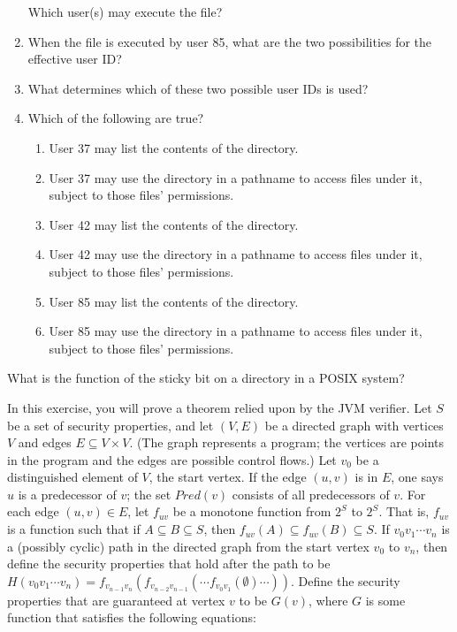 \begin{chapterEnumerate}
\begin{enumerate}
Which user(s) may execute the file?
\item
When the file is executed by user 85, what are the two possibilities
for the effective user ID?
\item
What determines which of these two possible user IDs is used?
\item
Which of the following are true?
\begin{enumerate}
\item
User 37 may list the contents of the directory.
\item
User 37 may use the directory in a pathname to access files under it,
subject to those files' permissions.
\item
User 42 may list the contents of the directory.
\item
User 42 may use the directory in a pathname to access files under it,
subject to those files' permissions.
\item
User 85 may list the contents of the directory.
\item
User 85 may use the directory in a pathname to access files under it,
subject to those files' permissions.
\end{enumerate}
\end{enumerate}
\item
What is the function of the sticky bit on a directory in a POSIX system?
\item\label{jvm-verifier-exercise}
In this exercise, you will prove a theorem relied upon by the JVM
verifier.  Let $S$ be a set of security properties, and let $(V,E)$ be a
directed graph with vertices $V$ and edges $E \subseteq V \times V$.
(The graph represents a program; the vertices are points in the
program and the edges are possible control flows.)  Let $v_0$ be a
distinguished element of $V$, the start vertex.  If the edge $(u,v)$
is in $E$, one says $u$ is a predecessor of $v$; the set $Pred(v)$
consists of all predecessors of $v$.  For each edge $(u,v) \in E$, let
$f_{uv}$ be a monotone function from $2^S$ to $2^S$.  That is,
$f_{uv}$ is a function such that if $A \subseteq B \subseteq S$, then
$f_{uv}(A) \subseteq f_{uv}(B) \subseteq S$.  If $v_0v_1\cdots v_n$ is
a (possibly cyclic) path in the directed graph from the start vertex $v_0$
to $v_n$, then define the security properties that hold after
the path to be $H(v_0v_1\cdots v_n) =
f_{v_{n-1}v_n}(f_{v_{n-2}v_{n-1}}(\cdots
f_{v_0v_1}(\emptyset)\cdots))$.  Define the security properties that
are guaranteed at vertex $v$ to be $G(v)$, where $G$ is some function
that satisfies the following equations:

\end{chapterEnumerate}
